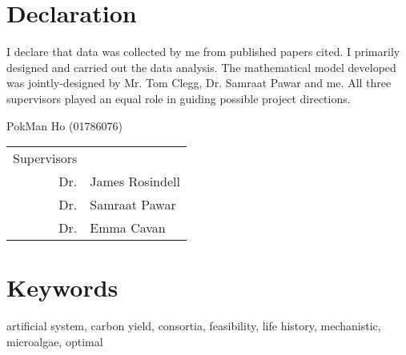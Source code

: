 \documentclass[../thesis.tex]{subfiles} %
\begin{document}
\maketitle\clearpage

\section*{Declaration}
I declare that data was collected by me from published papers cited.  I primarily designed and carried out the data analysis.  The mathematical model developed was jointly-designed by Mr. Tom Clegg, Dr. Samraat Pawar and me.  All three supervisors played an equal role in guiding possible project directions.

\begin{flushright}
PokMan Ho (01786076)

\begin{tabular}{rl}
    Supervisors & \\
    Dr. & James Rosindell \\
    Dr. & Samraat Pawar \\
    Dr. & Emma Cavan
\end{tabular}
\end{flushright}

\tableofcontents
\listoffigures
\listoftables

\section*{Keywords}
artificial system,
carbon yield,
consortia,
feasibility,
life history,
mechanistic,
microalgae,
optimal
\end{document}
